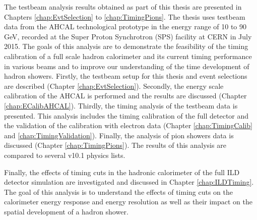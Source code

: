 The testbeam analysis results obtained as part of this thesis are presented in Chapters \ref{chap:EvtSelection} to \ref{chap:TimingPions}. The thesis uses testbeam data from the AHCAL technological prototype in the energy range of 10 to 90 GeV, recorded at the Super Proton Synchrotron (SPS) facility at CERN in July 2015. The goals of this analysis are to demonstrate the feasibility of the timing calibration of a full scale hadron calorimeter and its current timing performance in various beams and to improve our understanding of the time development of hadron showers. Firstly, the testbeam setup for this thesis and event selections are described (Chapter \ref{chap:EvtSelection}). Secondly, the energy scale calibration of the AHCAL is performed and the results are discussed (Chapter \ref{chap:ECalibAHCAL}). Thirdly, the timing analysis of the testbeam data is presented. This analysis includes the timing calibration of the full detector and the validation of the calibration with electron data (Chapter \ref{chap:TimingCalib} and \ref{chap:TimingValidation}). Finally, the analysis of pion showers data is discussed (Chapter \ref{chap:TimingPions}). The results of this analysis are compared to several \geant v10.1 physics lists.

Finally, the effects of timing cuts in the hadronic calorimeter of the full ILD detector simulation are investigated and discussed in Chapter \ref{chap:ILDTiming}. The goal of this analysis is to understand the effects of timing cuts on the calorimeter energy response and energy resolution as well as their impact on the spatial development of a hadron shower.
